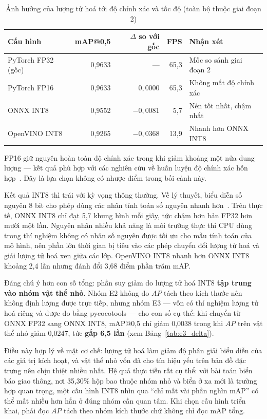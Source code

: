 \begin{table}[H]
\centering
\caption{Ảnh hưởng của lượng tử hoá tới độ chính xác và tốc độ (toàn bộ thuộc giai đoạn 2)}
\label{tab:e2}
\small
\begin{tabular}{lrrrl}
\toprule
\textbf{Cấu hình} & \textbf{mAP@0,5} & \textbf{$\Delta$ so với gốc} & \textbf{FPS} & \textbf{Nhận xét} \\
\midrule
PyTorch FP32 (gốc) & 0,9633 & ---      & 65,3 & Mốc so sánh giai đoạn 2 \\
PyTorch FP16       & 0,9633 & $0{,}0000$   & 65,3 & Không mất độ chính xác \\
ONNX INT8          & 0,9552 & $-0{,}0081$  & 5,7  & Nén tốt nhất, chậm nhất \\
OpenVINO INT8      & 0,9265 & $-0{,}0368$  & 13,9 & Nhanh hơn ONNX INT8 \\
\bottomrule
\end{tabular}
\end{table}

FP16 giữ nguyên hoàn toàn độ chính xác trong khi giảm khoảng một nửa dung lượng --- kết quả phù
hợp với các nghiên cứu về huấn luyện độ chính xác hỗn hợp~\cite{micikevicius2018mixedprecision}.
Đây là lựa chọn không có nhược điểm trong bối cảnh này.

Kết quả INT8 thì trái với kỳ vọng thông thường. Về lý thuyết, biểu diễn số nguyên 8 bit cho phép
dùng các nhân tính toán số nguyên nhanh hơn~\cite{jacob2018quantization}. Trên thực tế, ONNX INT8
chỉ đạt 5,7 khung hình mỗi giây, tức chậm hơn bản FP32 hơn mười một lần. Nguyên nhân nhiều khả
năng là môi trường thực thi CPU dùng trong thí nghiệm không có nhân số nguyên được tối ưu cho mẫu
tính toán của mô hình, nên phần lớn thời gian bị tiêu vào các phép chuyển đổi lượng tử hoá và giải
lượng tử hoá xen giữa các lớp. OpenVINO INT8 nhanh hơn ONNX INT8 khoảng 2,4 lần nhưng đánh đổi
3,68 điểm phần trăm mAP.

Đáng chú ý hơn con số tổng: phần suy giảm do lượng tử hoá INT8 \textbf{tập trung vào nhóm vật thể
nhỏ}. Nhóm E2 không đo $AP$ tách theo kích thước nên không định lượng được trực tiếp, nhưng nhóm E3
--- vốn có thí nghiệm lượng tử hoá riêng và được đo bằng pycocotools --- cho con số cụ thể: khi
chuyển từ ONNX FP32 sang ONNX INT8, mAP@0,5 chỉ giảm 0,0038 trong khi $AP$ trên vật thể nhỏ giảm
0,0247, tức \textbf{gấp 6,5 lần} (xem Bảng~\ref{tab:e3_delta}).

Điều này hợp lý về mặt cơ chế: lượng tử hoá làm giảm độ phân giải biểu diễn của các giá trị kích
hoạt, và vật thể nhỏ vốn đã cho tín hiệu yếu trên bản đồ đặc trưng nên chịu thiệt nhiều nhất. Hệ
quả thực tiễn rất cụ thể: với bài toán biển báo giao thông, nơi 35,30\% hộp bao thuộc nhóm nhỏ và
biển ở xa mới là trường hợp quan trọng, một cấu hình INT8 nhìn qua ``chỉ mất vài phần nghìn mAP''
có thể mất nhiều hơn hẳn ở đúng nhóm cần quan tâm. Khi chọn cấu hình triển khai, phải đọc $AP$ tách
theo nhóm kích thước chứ không chỉ đọc mAP tổng.

